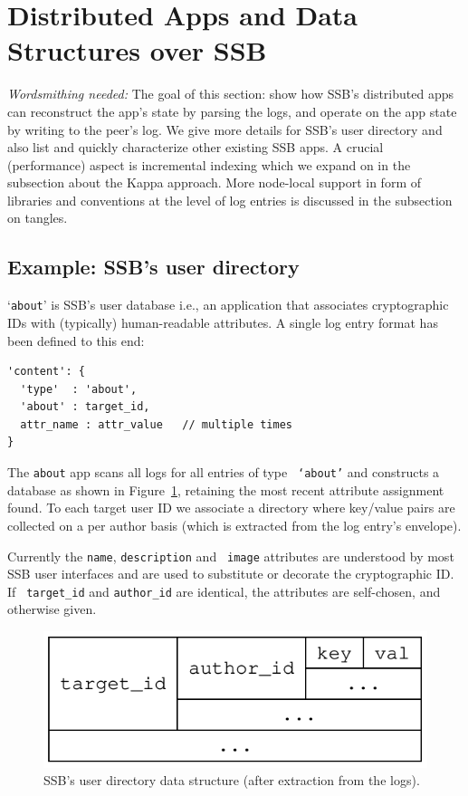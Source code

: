 \documentclass[sigconf]{acmart}
\begin{document}
\section{Distributed Apps and Data Structures over SSB}

{\em Wordsmithing needed:}
The goal of this section: show how SSB's distributed apps can reconstruct
the app's state by parsing the logs, and operate on the app state by
writing to the peer's log. We give more details for SSB's user
directory and also list and quickly characterize other existing
SSB apps. A crucial (performance) aspect is incremental indexing
which we expand on in the subsection about the Kappa approach. More
node-local support in form of libraries and conventions at the level
of log entries is discussed in the subsection on tangles.


\subsection{Example: SSB's user directory}

`{\small\tt about}' is SSB's user database i.e., an application that
associates cryptographic IDs with (typically) human-readable
attributes. A single log entry format has been defined to this end:
{\small\begin{verbatim}
'content': {
  'type'  : 'about',
  'about' : target_id,
  attr_name : attr_value   // multiple times
}
\end{verbatim}}

\noindent
The {\small\tt about} app scans all logs for all entries of type {\small\tt
  `about'} and constructs a database as shown in
Figure~\ref{fig:about}, retaining the most recent attribute assignment
found.  To each target user ID we associate a directory where
key/value pairs are collected on a per author basis (which is extracted
from the log entry's envelope).

Currently the {\small\tt name}, {\small\tt description} and {\small\tt
  image} attributes are understood by most SSB user interfaces and are
used to substitute or decorate the cryptographic ID. If {\small\tt
  target\_id} and {\small\tt author\_id} are identical, the
attributes are self-chosen, and otherwise given.

\begin{figure}[htb]
  \includegraphics[width=0.6\columnwidth]{figs/about-ds.pdf}
  \caption{SSB's user directory data structure (after extraction from the logs).}
  \label{fig:about}
\end{figure}
\end{document}
